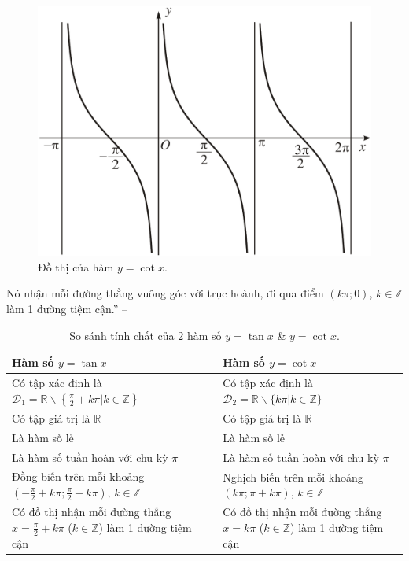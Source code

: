 \documentclass[oneside]{book}
\numberwithin{equation}{section}
\begin{document}
\begin{figure}[H]
	\centering
	\includegraphics[scale=0.15]{graph_cot}
	\caption{Đồ thị của hàm $y = \cot x$.}
	\label{fig:graph cot}
\end{figure}
Nó nhận mỗi đường thẳng vuông góc với trục hoành, đi qua điểm $(k\pi;0)$, $k\in\mathbb{Z}$ làm 1 đường tiệm cận.'' -- \cite[p. 12]{SGK_Toan_11_dai_so_giai_tich_nang_cao}

\begin{table}[H]
	\centering
	\begin{tabular}{|p{9cm}|p{9cm}|}
		\hline
		\textbf{Hàm số $y = \tan x$} & \textbf{Hàm số $y = \cot x$} \\
		\hline
		Có tập xác định là $\mathcal{D}_1 = \mathbb{R}\backslash\left\{\frac{\pi}{2} + k\pi|k\in\mathbb{Z}\right\}$ & Có tập xác định là $\mathcal{D}_2 = \mathbb{R}\backslash\{k\pi|k\in\mathbb{Z}\}$ \\
		\hline
		Có tập giá trị là $\mathbb{R}$ & Có tập giá trị là $\mathbb{R}$ \\
		\hline
		Là hàm số lẻ & Là hàm số lẻ \\
		\hline
		Là hàm số tuần hoàn với chu kỳ $\pi$ & Là hàm số tuần hoàn với chu kỳ $\pi$ \\
		\hline
		Đồng biến trên mỗi khoảng $\left(-\frac{\pi}{2} + k\pi;\frac{\pi}{2} + k\pi\right)$, $k\in\mathbb{Z}$ & Nghịch biến trên mỗi khoảng $(k\pi;\pi + k\pi)$, $k\in\mathbb{Z}$ \\
		\hline
		Có đồ thị nhận mỗi đường thẳng $x = \frac{\pi}{2} + k\pi$ ($k\in\mathbb{Z}$) làm 1 đường tiệm cận & Có đồ thị nhận mỗi đường thẳng $x = k\pi$ ($k\in\mathbb{Z}$) làm 1 đường tiệm cận \\
		\hline
	\end{tabular}
	\caption{So sánh tính chất của 2 hàm số $y = \tan x$ \& $y = \cot x$.}
\end{table}
\end{document}

